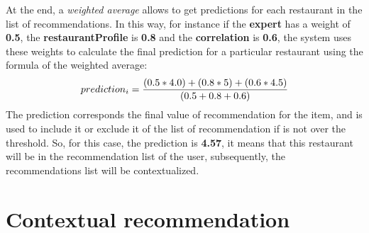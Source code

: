 At the end, a \textit{weighted average} allows to get predictions for
each restaurant in the list of recommendations. In this way, for
instance if the \textbf{expert} has a weight of \textbf{0.5}, the
\textbf{restaurantProfile} is \textbf{0.8} and the
\textbf{correlation} is \textbf{0.6}, the system uses these weights to
calculate the final prediction for a particular restaurant using the
formula of the weighted average:
\begin{equation}\label{eq:prediction}
\displaystyle prediction_{i} = {(0.5 * 4.0) + ( 0.8 * 5) + (0.6 * 4.5)
\over (0.5 + 0.8 + 0.6)}
\end{equation}
The prediction corresponds the final value of recommendation for the
item, and is used to include it or exclude it of the list of
recommendation if is not over the threshold. So, for this case, the
prediction is \textbf{4.57}, it means that this restaurant will be in the
recommendation list of the user, subsequently, the recommendations
list will be contextualized.

\section{Contextual recommendation} 

